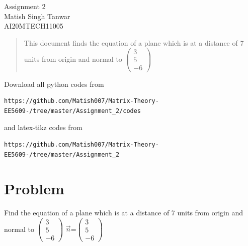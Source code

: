 \documentclass[journal,12pt,twocolumn]{IEEEtran}
\begin{document}
\begin{center}
\huge Assignment 2\\

\large Matish Singh Tanwar\\
\large AI20MTECH11005\\
\end{center}
\vspace{1.0cm}
\begin{abstract}
This document finds the equation of a plane which is at a distance of 7 units from origin and normal to $\begin{pmatrix}3\\5\\-6\end{pmatrix}$
\end{abstract}
\vspace{0.5cm}
Download all python codes from 
\begin{lstlisting}
https://github.com/Matish007/Matrix-Theory-EE5609-/tree/master/Assignment_2/codes
\end{lstlisting}
%
and latex-tikz codes from 
\begin{lstlisting}
https://github.com/Matish007/Matrix-Theory-EE5609-/tree/master/Assignment_2
\end{lstlisting}
%
\vspace{0.5mm}
\section{Problem}
Find the equation of a plane which is at a distance of 7 units from origin and normal to $\begin{pmatrix}3\\5\\-6\end{pmatrix}$
$\Vec{n}$=$\begin{pmatrix}3\\5\\-6\end{pmatrix}$\\
\end{document}
